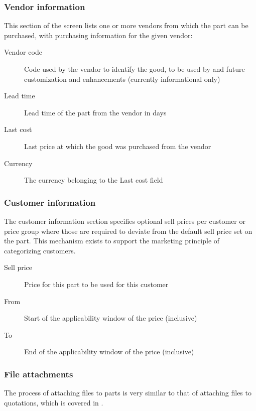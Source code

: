 \subsubsection{Vendor information}
\label{subsubsec-parts-vendor-information}

This section of the screen lists one or more vendors from which the part can be
purchased, with purchasing information for the given vendor:

\begin{description}
\item [Vendor code] Code used by the vendor to identify the good, to be used by
     and future customization and enhancements (currently informational only)
\item [Lead time] Lead time of the part from the vendor in days
\item [Last cost] Last price at which the good was purchased from the vendor
\item [Currency] The currency belonging to the Last cost field
\end{description}

\subsubsection{Customer information}
\label{subsubsec-parts-customer-information}

The customer information section specifies optional sell prices per customer or price group
where those are required to deviate from the default sell price set on the part. This mechanism exists
to support the marketing principle of categorizing customers.

\begin{description}
\item [Sell price] Price for this part to be used for this customer
\item [From] Start of the applicability window of the price (inclusive)
\item [To] End of the applicability window of the price (inclusive)
\end{description}

\subsubsection{File attachments}
\label{subsubsec-parts-file-attachments}

The process of attaching files to parts is very similar to that of
attaching files to quotations, which is covered in .

